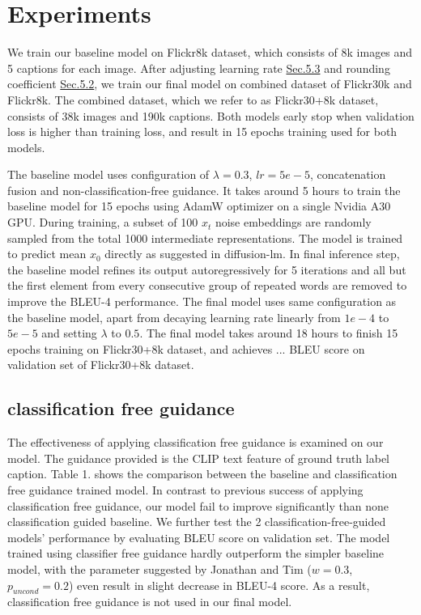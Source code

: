 \documentclass{article}
\begin{document}
\section{Experiments}
We train our baseline model on Flickr8k\cite{flickr8k} dataset, which consists of 8k images and 5 captions for each image. After adjusting learning rate \hyperref[sec:lr-exp]{Sec.5.3} and rounding coefficient \hyperref[sec:lambda-exp]{Sec.5.2}, we train our final model on combined dataset of Flickr30k\cite{flickr30k} and Flickr8k\cite{flickr8k}. The combined dataset, which we refer to as Flickr30+8k dataset, consists of 38k images and 190k captions. Both models early stop when validation loss is higher than training loss, and result in 15 epochs training used for both models.

The baseline model uses configuration of $\lambda = 0.3$, $lr = 5e-5$, concatenation fusion and non-classification-free guidance. It takes around 5 hours to train the baseline model for 15 epochs using AdamW optimizer on a single Nvidia A30 GPU. During training, a subset of 100 $x_t$ noise embeddings are randomly sampled from the total 1000 intermediate representations. The model is trained to predict mean $x_0$ directly as suggested in diffusion-lm\cite{diffuselm}. In final inference step, the baseline model refines its output autoregressively for 5 iterations and all but the first element from every consecutive group of repeated words are removed to improve the BLEU-4 performance. The final model uses same configuration as the baseline model, apart from decaying learning rate linearly from $1e-4$ to $5e-5$ and setting $\lambda$ to $0.5$. The final model takes around 18 hours to finish 15 epochs training on Flickr30+8k dataset, and achieves ... BLEU score on validation set of Flickr30+8k dataset.

\subsection{classification free guidance}
\label{sec:classification-free-exp}
The effectiveness of applying classification free guidance is examined on our model. The guidance provided is the CLIP text feature of ground truth label caption. Table 1. shows the comparison between the baseline and classification free guidance trained model. In contrast to previous success of applying classification free guidance, our model fail to improve significantly than none classification guided baseline. We further test the 2 classification-free-guided models' performance by evaluating BLEU score on validation set. The model trained using classifier free guidance hardly outperform the simpler baseline model, with the parameter suggested by Jonathan and Tim \cite{classifier-free} ($w = 0.3$, $p_{uncond} = 0.2$) even result in slight decrease in BLEU-4 score. As a result, classification free guidance is not used in our final model.
\end{document}
